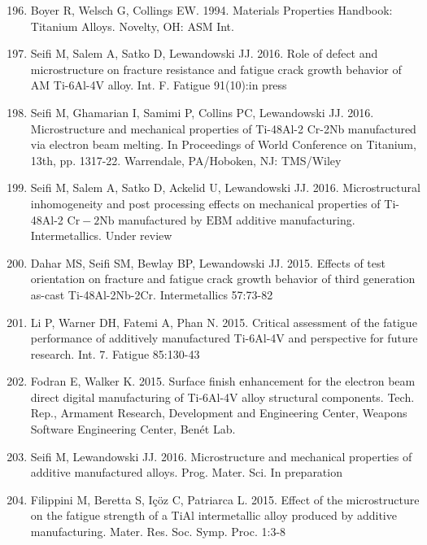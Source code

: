 \documentclass[10pt]{article}
\begin{document}
\begin{enumerate}
  \setcounter{enumi}{195}
  \item Boyer R, Welsch G, Collings EW. 1994. Materials Properties Handbook: Titanium Alloys. Novelty, OH: ASM Int.

  \item Seifi M, Salem A, Satko D, Lewandowski JJ. 2016. Role of defect and microstructure on fracture resistance and fatigue crack growth behavior of AM Ti-6Al-4V alloy. Int. F. Fatigue 91(10):in press

  \item Seifi M, Ghamarian I, Samimi P, Collins PC, Lewandowski JJ. 2016. Microstructure and mechanical properties of Ti-48Al-2 Cr-2Nb manufactured via electron beam melting. In Proceedings of World Conference on Titanium, 13th, pp. 1317-22. Warrendale, PA/Hoboken, NJ: TMS/Wiley

  \item Seifi M, Salem A, Satko D, Ackelid U, Lewandowski JJ. 2016. Microstructural inhomogeneity and post processing effects on mechanical properties of Ti-48Al-2 $\mathrm{Cr}-2 \mathrm{Nb}$ manufactured by $\mathrm{EBM}$ additive manufacturing. Intermetallics. Under review

  \item Dahar MS, Seifi SM, Bewlay BP, Lewandowski JJ. 2015. Effects of test orientation on fracture and fatigue crack growth behavior of third generation as-cast Ti-48Al-2Nb-2Cr. Intermetallics 57:73-82

  \item Li P, Warner DH, Fatemi A, Phan N. 2015. Critical assessment of the fatigue performance of additively manufactured Ti-6Al-4V and perspective for future research. Int. 7. Fatigue 85:130-43

  \item Fodran E, Walker K. 2015. Surface finish enhancement for the electron beam direct digital manufacturing of Ti-6Al-4V alloy structural components. Tech. Rep., Armament Research, Development and Engineering Center, Weapons Software Engineering Center, Benét Lab.

  \item Seifi M, Lewandowski JJ. 2016. Microstructure and mechanical properties of additive manufactured alloys. Prog. Mater. Sci. In preparation

  \item Filippini M, Beretta S, Içöz C, Patriarca L. 2015. Effect of the microstructure on the fatigue strength of a TiAl intermetallic alloy produced by additive manufacturing. Mater. Res. Soc. Symp. Proc. 1:3-8


\end{enumerate}
\end{document}
